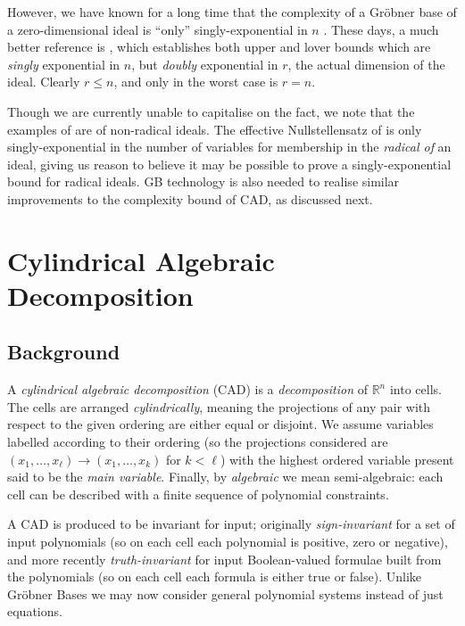 \documentclass{llncs}
\begin{document}
However, we have known for a long time that the complexity of a Gr\"obner base of a zero-dimensional ideal is ``only'' singly-exponential in $n$ \cite{Lazard1983}.
These days, a much better reference is \cite{MR13}, which establishes both upper and lover bounds which are \emph{singly} exponential in $n$, but \emph{doubly} exponential in $r$, the actual dimension of the ideal. Clearly $r\le n$, and only in the worst case is $r=n$.

Though we are currently unable to capitalise on the fact, we note that the examples of  \cite{MM82,MR13} are of non-radical ideals. The effective Nullstellensatz of \cite{Kollar1988} is only singly-exponential in the number of variables for membership in the \emph{radical of} an ideal, giving us reason to believe it may be possible to prove a singly-exponential bound for radical ideals.  GB technology is also needed to realise similar improvements to the complexity bound of CAD, as discussed next.



\section{Cylindrical Algebraic Decomposition}
\label{SEC-CAD}


\subsection{Background}

A \emph{cylindrical algebraic decomposition} (CAD) is a \emph{decomposition} of $\mathbb{R}^n$   into cells.  The cells are arranged \emph{cylindrically}, meaning the projections of any pair with respect to the given ordering are either equal or disjoint.  We assume variables labelled according to their ordering (so the projections considered are $(x_1,\ldots,x_{\ell})\rightarrow(x_1,\ldots,x_k)$ for $k<\ell$) with the highest ordered variable present said to be the \emph{main variable}.  Finally, by \emph{algebraic} we mean semi-algebraic: each cell can be described with a finite sequence of polynomial constraints.  

A CAD is produced to be invariant for input; originally \emph{sign-invariant} for a set of input polynomials (so on each cell each polynomial is positive, zero or negative), and more recently \emph{truth-invariant} for input Boolean-valued  formulae built from the polynomials (so on each cell each formula is either true or false).  Unlike Gr\"{o}bner Bases we may now consider general polynomial systems instead of just equations.
\end{document}
